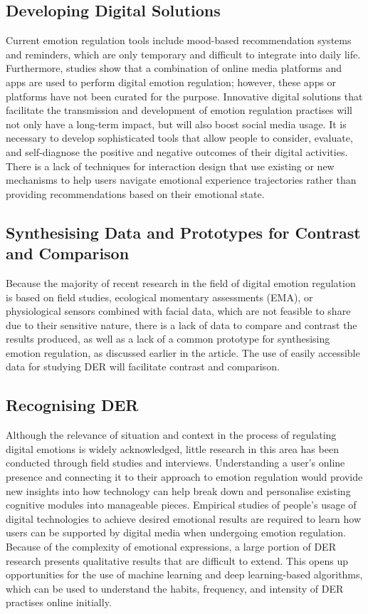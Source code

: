 \documentclass[lettersize,journal]{IEEEtran}
\begin{document}
\subsection{Developing Digital Solutions} Current emotion regulation tools include mood-based recommendation systems and reminders, which are only temporary and difficult to integrate into daily life. Furthermore, studies show that a combination of online media platforms and apps are used to perform digital emotion regulation; however, these apps or platforms have not been curated for the purpose.
Innovative digital solutions that facilitate the transmission and development of emotion regulation practises will not only have a long-term impact, but will also boost social media usage. It is necessary to develop sophisticated tools that allow people to consider, evaluate, and self-diagnose the positive and negative outcomes of their digital activities. There is a lack of techniques for interaction design that use existing or new mechanisms to help users navigate emotional experience trajectories rather than providing recommendations based on their emotional state.

\subsection{Synthesising Data and Prototypes for Contrast and Comparison} Because the majority of recent research in the field of digital emotion regulation is based on field studies, ecological momentary assessments (EMA), or physiological sensors combined with facial data, which are not feasible to share due to their sensitive nature, there is a lack of data to compare and contrast the results produced, as well as a lack of a common prototype for synthesising emotion regulation, as discussed earlier in the article. The use of easily accessible data for studying DER will facilitate contrast and comparison.

\subsection{Recognising DER} Although the relevance of situation and context in the process of regulating digital emotions is widely acknowledged, little research in this area has been conducted through field studies and interviews. Understanding a user's online presence and connecting it to their approach to emotion regulation would provide new insights into how technology can help break down and personalise existing cognitive modules into manageable pieces. Empirical studies of people's usage of digital technologies to achieve desired emotional results are required to learn how users can be supported by digital media when undergoing emotion regulation. Because of the complexity of emotional expressions, a large portion of DER research presents qualitative results that are difficult to extend. This opens up opportunities for the use of machine learning and deep learning-based algorithms, which can be used to understand the habits, frequency, and intensity of DER practises online initially.
\end{document}
